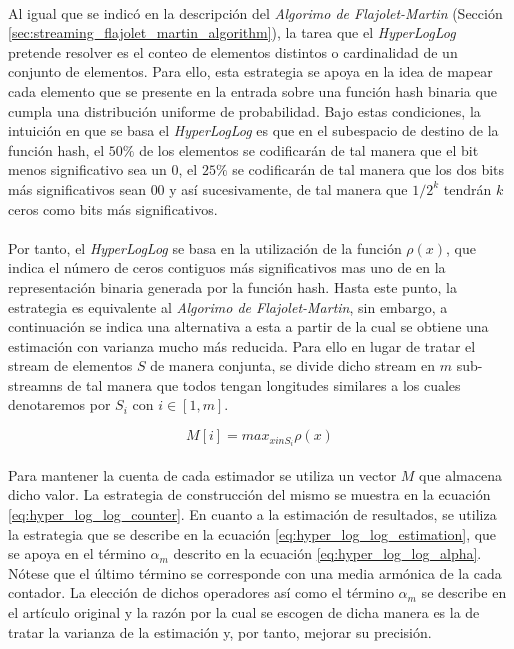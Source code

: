 \documentclass{subfiles}
\begin{document}
      \paragraph{}
      Al igual que se indicó en la descripción del \emph{Algorimo de Flajolet-Martin} (Sección \ref{sec:streaming_flajolet_martin_algorithm}), la tarea que el \emph{HyperLogLog} pretende resolver es el conteo de elementos distintos o cardinalidad de un conjunto de elementos. Para ello, esta estrategia se apoya en la idea de mapear cada elemento que se presente en la entrada sobre una función hash binaria que cumpla una distribución uniforme de probabilidad. Bajo estas condiciones, la intuición en que se basa el \emph{HyperLogLog} es que en el subespacio de destino de la función hash, el $50\%$ de los elementos se codificarán de tal manera que el bit menos significativo sea un $0$, el $25\%$ se codificarán de tal manera que los dos bits más significativos sean $00$ y así sucesivamente, de tal manera que $1/2^k$ tendrán $k$ ceros como bits más significativos.

      \paragraph{}
      Por tanto, el \emph{HyperLogLog} se basa en la utilización de la función $\rho(x)$, que indica el número de ceros contiguos más significativos mas uno de en la representación binaria generada por la función hash. Hasta este punto, la estrategia es equivalente al \emph{Algorimo de Flajolet-Martin}, sin embargo, a continuación se indica una alternativa a esta a partir de la cual se obtiene una estimación con varianza mucho más reducida. Para ello en lugar de tratar el stream de elementos $S$ de manera conjunta, se divide dicho stream en $m$ sub-streamns de tal manera que todos tengan longitudes similares a los cuales denotaremos por $S_i$ con $i \in [1,m]$.

      \begin{equation}
      \label{eq:hyper_log_log_counter}
        M[i] = max_{x in S_i}\rho(x)
      \end{equation}

      \paragraph{}
      Para mantener la cuenta de cada estimador se utiliza un vector $M$ que almacena dicho valor. La estrategia de construcción del mismo se muestra en la ecuación \eqref{eq:hyper_log_log_counter}. En cuanto a la estimación de resultados, se utiliza la estrategia que se describe en la ecuación \eqref{eq:hyper_log_log_estimation}, que se apoya en el término $\alpha_m$ descrito en la ecuación \eqref{eq:hyper_log_log_alpha}. Nótese que el último término se corresponde con una media armónica de la cada contador. La elección de dichos operadores así como el término $\alpha_m$ se describe en el artículo original \cite{flajolet2007hyperloglog} y la razón por la cual se escogen de dicha manera es la de tratar la varianza de la estimación y, por tanto, mejorar su precisión.
\end{document}
